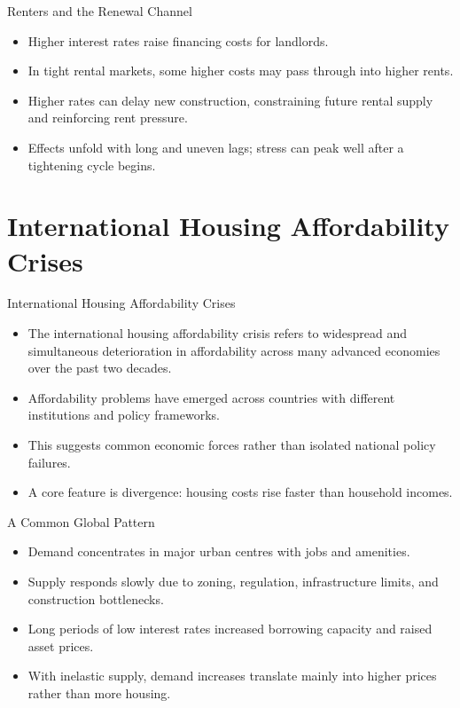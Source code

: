 \documentclass[aspectratio=169]{beamer}
\begin{document}
\begin{frame}{Renters and the Renewal Channel}
\transfade
\begin{itemize}[<+->]
  \item Higher interest rates raise financing costs for landlords.
  \item In tight rental markets, some higher costs may pass through into higher rents.
  \item Higher rates can delay new construction, constraining future rental supply and reinforcing rent pressure.
  \item Effects unfold with long and uneven lags; stress can peak well after a tightening cycle begins.
\end{itemize}
\end{frame}

\section{International Housing Affordability Crises}

\begin{frame}{International Housing Affordability Crises}
\transfade
\begin{itemize}[<+->]
  \item The international housing affordability crisis refers to widespread and simultaneous deterioration in affordability across many advanced economies over the past two decades.
  \item Affordability problems have emerged across countries with different institutions and policy frameworks.
  \item This suggests common economic forces rather than isolated national policy failures.
  \item A core feature is divergence: housing costs rise faster than household incomes.
\end{itemize}
\end{frame}

\begin{frame}{A Common Global Pattern}
\transfade
\begin{itemize}[<+->]
  \item Demand concentrates in major urban centres with jobs and amenities.
  \item Supply responds slowly due to zoning, regulation, infrastructure limits, and construction bottlenecks.
  \item Long periods of low interest rates increased borrowing capacity and raised asset prices.
  \item With inelastic supply, demand increases translate mainly into higher prices rather than more housing.
\end{itemize}
\end{frame}
\end{document}
